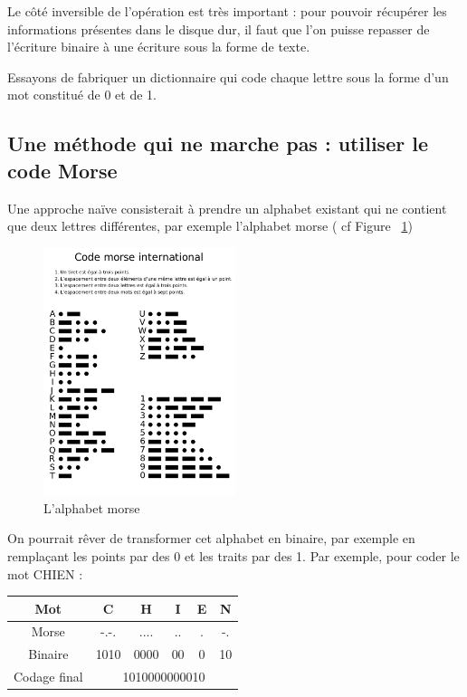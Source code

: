 \documentclass[10pt,a4paper]{book}
\begin{document}
Le côté inversible de l'opération est très important : pour pouvoir récupérer les informations présentes dans le disque dur, il faut que l'on puisse repasser de l'écriture binaire à une écriture sous la forme de texte.

Essayons de fabriquer un dictionnaire qui code chaque lettre sous la forme d'un mot constitué de 0 et de 1. 


\subsection{Une méthode qui ne marche pas : utiliser le code Morse}

Une approche naïve consisterait à prendre un alphabet existant qui ne contient que deux lettres différentes, par exemple l'alphabet morse ( cf Figure ~\ref{fig:Ensembles})

\begin{figure}[htbp]
\centering
\includegraphics[width=0.5\textwidth]{morse.png}
\caption{L'alphabet morse}
\label{fig:Ensembles}
\end{figure}


On pourrait rêver de transformer cet alphabet en binaire, par exemple en remplaçant les points par des 0 et les traits par des 1.  Par exemple, pour coder le mot CHIEN :


\begin{center}
    \begin{tabular}{|c|c|c|c|c|c|}
         \hline
         Mot & C & H & I & E & N \\
         \hline
         Morse & -.-. & .... & .. & . & -.  \\
         \hline
         Binaire & 1010 & 0000 & 00 & 0 & 10\\
         \hline
         Codage final &\multicolumn{5}{c|}{1010000000010}\\
         \hline
    \end{tabular}
\end{center}
\end{document}
